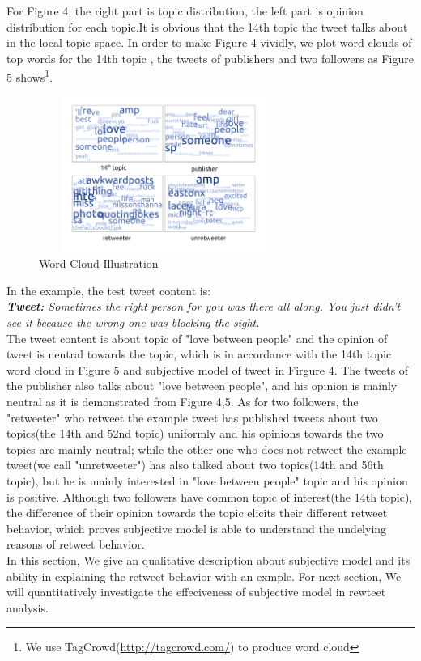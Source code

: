 \documentclass{acm_proc_article-sp}
\begin{document}
For Figure 4, the right part is topic distribution, the left part is opinion distribution for each topic.It is obvious that the 14th topic the tweet talks about in the local topic space.
In order to make Figure 4 vividly, we plot word clouds of top words for the 14th topic , the tweets of publishers and two followers as Figure 5 shows\footnote{We use TagCrowd(\url{http://tagcrowd.com/}) to produce word cloud}.
\begin{figure}
\centering
\includegraphics[width=3.2in,height=2.0in]{text_cloud.pdf}
\caption{Word Cloud Illustration}
\label{fig:graph5}
\end{figure}
In the example, the test tweet content is:\\
\textit{\textbf{Tweet:} Sometimes the right person for you was there all along. You just didn’t see it because the wrong one was blocking the sight.}\\
The tweet content is about topic of "love between people" and the opinion of tweet is neutral towards the topic, which is in accordance with the 14th topic word cloud in Figure 5 and subjective model of tweet in Firgure 4.
The tweets of the publisher also talks about "love between people", and his opinion is mainly neutral as it is demonstrated from Figure 4,5.
As for two followers, the "retweeter" who retweet the example tweet has published tweets about two topics(the 14th and 52nd topic) uniformly and his opinions towards the two topics are mainly neutral;
while the other one who does not retweet the example tweet(we call "unretweeter") has also talked about two topics(14th and 56th topic), but he is mainly interested in "love between people" topic and his opinion is positive.
Although two followers have common topic of interest(the 14th topic), the difference of their opinion towards the topic elicits their different retweet behavior, which proves subjective model is able to understand the undelying reasons of retweet behavior.\\
In this section, We give an qualitative description about subjective model and its ability in explaining the retweet behavior with an exmple.
For next section, We will quantitatively investigate the effeciveness of subjective model in rewteet analysis. 
\end{document}
